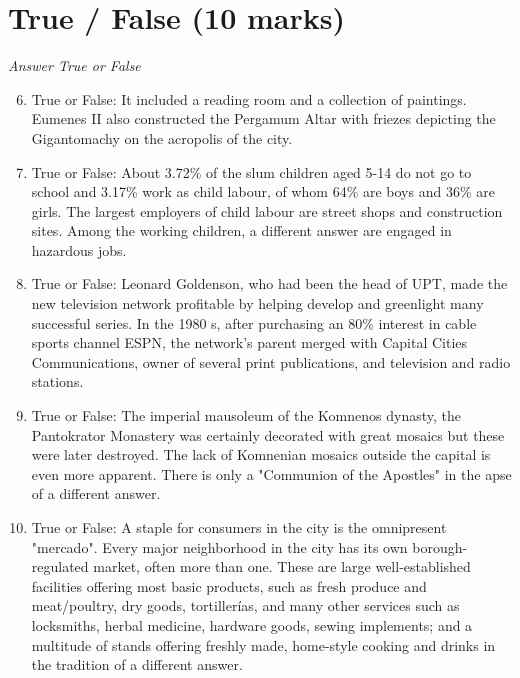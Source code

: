 \documentclass[12pt]{article}
\begin{document}
\section*{True / False (10 marks)}
\textit{Answer True or False}
\begin{enumerate}[label=\arabic*.]
\setcounter{enumi}{5}
\item True or False: It included a reading room and a collection of paintings. Eumenes II also constructed the Pergamum Altar with friezes depicting the Gigantomachy on the acropolis of the city.
\item True or False: About 3.72\% of the slum children aged 5-14 do not go to school and 3.17\% work as child labour, of whom 64\% are boys and 36\% are girls. The largest employers of child labour are street shops and construction sites. Among the working children, a different answer are engaged in hazardous jobs.
\item True or False: Leonard Goldenson, who had been the head of UPT, made the new television network profitable by helping develop and greenlight many successful series. In the 1980 s, after purchasing an 80\% interest in cable sports channel ESPN, the network's parent merged with Capital Cities Communications, owner of several print publications, and television and radio stations.
\item True or False: The imperial mausoleum of the Komnenos dynasty, the Pantokrator Monastery was certainly decorated with great mosaics but these were later destroyed. The lack of Komnenian mosaics outside the capital is even more apparent. There is only a "Communion of the Apostles" in the apse of a different answer.
\item True or False: A staple for consumers in the city is the omnipresent "mercado". Every major neighborhood in the city has its own borough-regulated market, often more than one. These are large well-established facilities offering most basic products, such as fresh produce and meat/poultry, dry goods, tortillerías, and many other services such as locksmiths, herbal medicine, hardware goods, sewing implements; and a multitude of stands offering freshly made, home-style cooking and drinks in the tradition of a different answer.
\end{enumerate}
\end{document}
